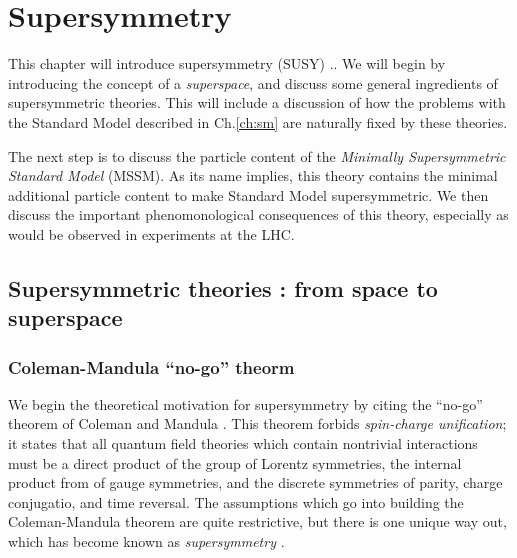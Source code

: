 

\chapter[Supersymmetry][Top of Page Title]{Supersymmetry}\label{ch:susy}

This chapter will introduce supersymmetry (SUSY) \cite{Lykken:1996xt, susyPrimer} ..
We will begin by introducing the concept of a \textit{superspace}, and discuss some general ingredients of supersymmetric theories.
This will include a discussion of how the problems with the Standard Model described in Ch.\ref{ch:sm} are naturally fixed by these theories.

The next step is to discuss the particle content of the \textit{Minimally Supersymmetric Standard Model} (MSSM).
As its name implies, this theory contains the minimal additional particle content to make Standard Model supersymmetric.
We then discuss the important phenomonological consequences of this theory, especially as would be observed in experiments at the LHC.

\section{Supersymmetric theories : from space to superspace}

\subsection{Coleman-Mandula ``no-go'' theorm}

We begin the theoretical motivation for supersymmetry by citing the ``no-go'' theorem of Coleman and Mandula \cite{Coleman:1967ad}.
This theorem forbids \textit{spin-charge unification}; it states that all quantum field theories which contain nontrivial interactions must be a direct product of the \Poincare group of Lorentz symmetries, the internal product from of gauge symmetries, and the discrete symmetries of parity, charge conjugatio, and time reversal.
The assumptions which go into building the Coleman-Mandula theorem are quite restrictive, but there is one unique way out, which has become known as \textit{supersymmetry} \cite{Golfand:1971iw, Haag:1974qh}.



